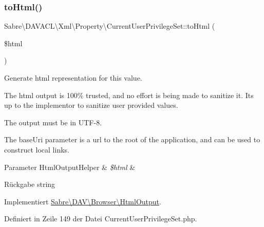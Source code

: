 \subsubsection{\texorpdfstring{to\+Html()}{toHtml()}}
{\footnotesize\ttfamily Sabre\textbackslash{}\+D\+A\+V\+A\+C\+L\textbackslash{}\+Xml\textbackslash{}\+Property\textbackslash{}\+Current\+User\+Privilege\+Set\+::to\+Html (\begin{DoxyParamCaption}\item[{\mbox{\hyperlink{class_sabre_1_1_d_a_v_1_1_browser_1_1_html_output_helper}{Html\+Output\+Helper}}}]{\$html }\end{DoxyParamCaption})}

Generate html representation for this value.

The html output is 100\% trusted, and no effort is being made to sanitize it. It\textquotesingle{}s up to the implementor to sanitize user provided values.

The output must be in U\+T\+F-\/8.

The base\+Uri parameter is a url to the root of the application, and can be used to construct local links.


\begin{DoxyParams}[1]{Parameter}
Html\+Output\+Helper & {\em \$html} & \\
\hline
\end{DoxyParams}
\begin{DoxyReturn}{Rückgabe}
string 
\end{DoxyReturn}


Implementiert \mbox{\hyperlink{interface_sabre_1_1_d_a_v_1_1_browser_1_1_html_output_a53a24f82474cef8c1fcf00e87de3bf7c}{Sabre\textbackslash{}\+D\+A\+V\textbackslash{}\+Browser\textbackslash{}\+Html\+Output}}.



Definiert in Zeile 149 der Datei Current\+User\+Privilege\+Set.\+php.

\mbox{\label{class_sabre_1_1_d_a_v_a_c_l_1_1_xml_1_1_property_1_1_current_user_privilege_set_a91512d74a26e294a1aafa50f122291b3}} 
